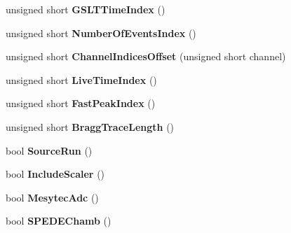 \begin{DoxyCompactItemize}
\item 
\hypertarget{class_global_settings_ae67adcfbae5f32f70dbaccb354083599}{unsigned short {\bfseries G\-S\-L\-T\-Time\-Index} ()}\label{class_global_settings_ae67adcfbae5f32f70dbaccb354083599}

\item 
\hypertarget{class_global_settings_a16fcf54c004f5b2cf38aafd747fd8df3}{unsigned short {\bfseries Number\-Of\-Events\-Index} ()}\label{class_global_settings_a16fcf54c004f5b2cf38aafd747fd8df3}

\item 
\hypertarget{class_global_settings_a9832ff3e3e2c8ffdd743ecef761c29fb}{unsigned short {\bfseries Channel\-Indices\-Offset} (unsigned short channel)}\label{class_global_settings_a9832ff3e3e2c8ffdd743ecef761c29fb}

\item 
\hypertarget{class_global_settings_a7984f02f9041a1a053a5bb504814aff5}{unsigned short {\bfseries Live\-Time\-Index} ()}\label{class_global_settings_a7984f02f9041a1a053a5bb504814aff5}

\item 
\hypertarget{class_global_settings_a3045c1e47cf31b2a1f2cdd036d2983d1}{unsigned short {\bfseries Fast\-Peak\-Index} ()}\label{class_global_settings_a3045c1e47cf31b2a1f2cdd036d2983d1}

\item 
\hypertarget{class_global_settings_a736690f2a63bcdb18f04f9831a484240}{unsigned short {\bfseries Bragg\-Trace\-Length} ()}\label{class_global_settings_a736690f2a63bcdb18f04f9831a484240}

\item 
\hypertarget{class_global_settings_a111d8b0e788e3709b00702f3a7ae2728}{bool {\bfseries Source\-Run} ()}\label{class_global_settings_a111d8b0e788e3709b00702f3a7ae2728}

\item 
\hypertarget{class_global_settings_a49c569d0d122bff3736e8e3debbfd013}{bool {\bfseries Include\-Scaler} ()}\label{class_global_settings_a49c569d0d122bff3736e8e3debbfd013}

\item 
\hypertarget{class_global_settings_acfaa849a405a80e912b1c42c7b0c258c}{bool {\bfseries Mesytec\-Adc} ()}\label{class_global_settings_acfaa849a405a80e912b1c42c7b0c258c}

\item 
\hypertarget{class_global_settings_a4a48a1c192b77998f1b1111d73aeaf5a}{bool {\bfseries S\-P\-E\-D\-E\-Chamb} ()}\label{class_global_settings_a4a48a1c192b77998f1b1111d73aeaf5a}


\end{DoxyCompactItemize}
